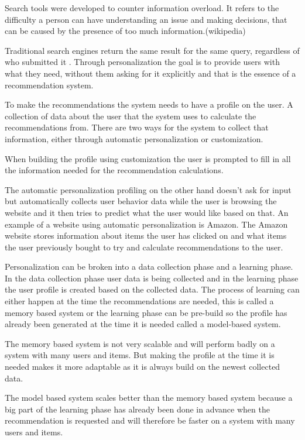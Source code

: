 Search tools were developed to counter information overload. It refers to the difficulty a person can have understanding an issue and making decisions, that can be caused by the presence of too much information.(wikipedia)

Traditional search engines return the same result for the same query, regardless of who submitted it \cite{TheAdaptiveWeb}. Through personalization the goal is to provide users with what they need, without them asking for it explicitly and that is the essence of a recommendation system.

To make the recommendations the system needs to have a profile on the user. A collection of data about the user that the system uses to calculate the recommendations from. There are two ways for the system to collect that information, either through automatic personalization or customization.

When building the profile using customization the user is prompted to fill in all the information needed for the recommendation calculations.

The automatic personalization profiling on the other hand doesn't ask for input but automatically collects user behavior data while the user is browsing the website and it then tries to predict what the user would like based on that. An example of a website using automatic personalization is Amazon. The Amazon website stores information about items the user has clicked on and what items the user previously bought to try and calculate recommendations to the user. 	
   
Personalization can be broken into a data collection phase and a learning phase. In the data collection phase user data is being collected and in the learning phase the user profile is created based on the collected data. The process of learning can either happen at the time the recommendations are needed, this is called a memory based system or the learning phase can be pre-build so the profile has already been generated at the time it is needed called a model-based system.	

The memory based system is not very scalable and will perform badly on a system with many users and items. But making the profile at the time it is needed makes it more adaptable as it is always build on the newest collected data.

The model based system scales better than the memory based system because a big part of the learning phase has already been done in advance when the recommendation is requested and will therefore be faster on a system with many users and items. 
